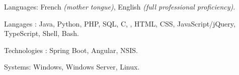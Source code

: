 \begin{indentsection}{\parindent}
\begin{description*}
  \item[Languages:]
  French \emph{(mother tongue)}, English \emph{(full professional proficiency)}.
 \item[Langages :] Java, Python, PHP, SQL, C, \Csharp, HTML,
  CSS, JavaScript/jQuery, TypeScript, Shell, Bash.
  \item[Technologies :] Spring Boot, Angular, NSIS.
  \item[Systems:] Windows, Windows Server, Linux.
\end{description*}
\end{indentsection}
